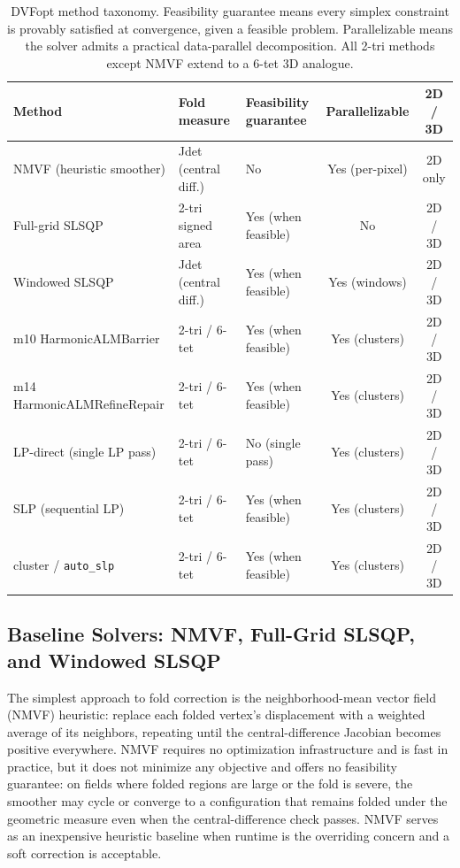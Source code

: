 \begin{table}[ht]
\centering
\caption{DVFopt method taxonomy. Feasibility guarantee means every simplex constraint is provably satisfied at convergence, given a feasible problem. Parallelizable means the solver admits a practical data-parallel decomposition. All 2-tri methods except NMVF extend to a 6-tet 3D analogue.}
\label{tab:method_taxonomy}
\renewcommand{\arraystretch}{1.2}
\begin{tabular}{lllcc}
\toprule
\textbf{Method} & \textbf{Fold measure} & \textbf{Feasibility guarantee} & \textbf{Parallelizable} & \textbf{2D / 3D} \\
\midrule
NMVF (heuristic smoother)       & Jdet (central diff.) & No                  & Yes (per-pixel) & 2D only \\
Full-grid SLSQP                  & 2-tri signed area    & Yes (when feasible) & No              & 2D / 3D \\
Windowed SLSQP                  & Jdet (central diff.) & Yes (when feasible) & Yes (windows)   & 2D / 3D \\
\midrule
m10 HarmonicALMBarrier           & 2-tri / 6-tet        & Yes (when feasible) & Yes (clusters)  & 2D / 3D \\
m14 HarmonicALMRefineRepair      & 2-tri / 6-tet        & Yes (when feasible) & Yes (clusters)  & 2D / 3D \\
\midrule
LP-direct (single LP pass)       & 2-tri / 6-tet        & No (single pass)    & Yes (clusters)  & 2D / 3D \\
SLP (sequential LP)              & 2-tri / 6-tet        & Yes (when feasible) & Yes (clusters)  & 2D / 3D \\
cluster / \texttt{auto\_slp}     & 2-tri / 6-tet        & Yes (when feasible) & Yes (clusters)  & 2D / 3D \\
\bottomrule
\end{tabular}
\end{table}

\subsection{Baseline Solvers: NMVF, Full-Grid SLSQP, and Windowed SLSQP}
\label{sec:baseline_solvers}

The simplest approach to fold correction is the neighborhood-mean vector field (NMVF) heuristic: replace each folded vertex's displacement with a weighted average of its neighbors, repeating until the central-difference Jacobian becomes positive everywhere. NMVF requires no optimization infrastructure and is fast in practice, but it does not minimize any objective and offers no feasibility guarantee: on fields where folded regions are large or the fold is severe, the smoother may cycle or converge to a configuration that remains folded under the geometric measure even when the central-difference check passes. NMVF serves as an inexpensive heuristic baseline when runtime is the overriding concern and a soft correction is acceptable.

